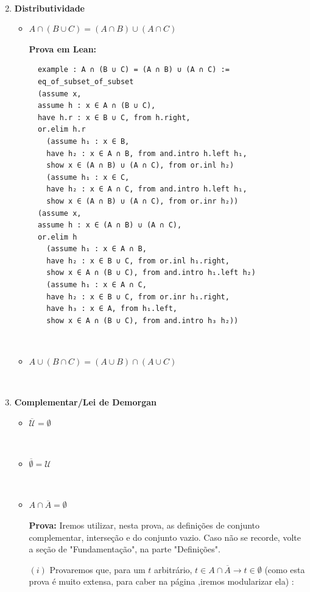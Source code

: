 \begin{enumerate}
$\qquad$

\item{\textbf{Distributividade}}
\begin{itemize}
\item $A \cap (B \cup C) = (A \cap B) \cup (A \cap C)$

\textbf{Prova em Lean:}
\begin{lstlisting}
  example : A ∩ (B ∪ C) = (A ∩ B) ∪ (A ∩ C) :=
  eq_of_subset_of_subset
  (assume x,
  assume h : x ∈ A ∩ (B ∪ C),
  have h.r : x ∈ B ∪ C, from h.right,
  or.elim h.r
    (assume h₁ : x ∈ B,
    have h₂ : x ∈ A ∩ B, from and.intro h.left h₁,
    show x ∈ (A ∩ B) ∪ (A ∩ C), from or.inl h₂)
    (assume h₁ : x ∈ C,
    have h₂ : x ∈ A ∩ C, from and.intro h.left h₁,
    show x ∈ (A ∩ B) ∪ (A ∩ C), from or.inr h₂))
  (assume x,
  assume h : x ∈ (A ∩ B) ∪ (A ∩ C),
  or.elim h
    (assume h₁ : x ∈ A ∩ B,
    have h₂ : x ∈ B ∪ C, from or.inl h₁.right,
    show x ∈ A ∩ (B ∪ C), from and.intro h₁.left h₂)
    (assume h₁ : x ∈ A ∩ C,
    have h₂ : x ∈ B ∪ C, from or.inr h₁.right,
    have h₃ : x ∈ A, from h₁.left,
    show x ∈ A ∩ (B ∪ C), from and.intro h₃ h₂))\end{lstlisting}

$\qquad$

\item $A \cup (B \cap C) = (A \cup B) \cap (A \cup C)$
\end{itemize}

$\qquad$

\item{\textbf{Complementar/Lei de Demorgan}}
\begin{itemize}
\item $\mathcal \overline U= \emptyset$

$\qquad$

\item $\overline \emptyset = \mathcal U$

$\qquad$

\item $A \cap \overline{A} = \emptyset$

\textbf{Prova:}
    Iremos utilizar, nesta prova, as definições de conjunto complementar, interseção e do conjunto vazio. Caso não se recorde, volte a seção de "Fundamentação", na parte "Definições".
    
    $(i)$ Provaremos que, para um $t$ arbitrário, $ t \in A \cap \overline A \rightarrow t \in \emptyset $ (como esta prova é muito extensa, para caber na página ,iremos modularizar ela) :
    

\end{itemize}
\end{enumerate}

